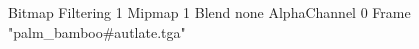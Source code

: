{Bitmap
	{Filtering 1}
	{Mipmap 1}
	{Blend none}
	{AlphaChannel 0}
	{Frame "palm_bamboo#autlate.tga"}
}
